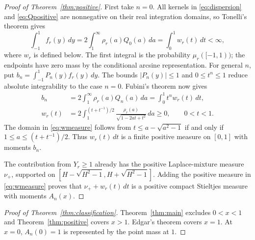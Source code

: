 \begin{proof}[Proof of Theorem~\ref{thm:positive}]
First take $n=0$. All kernels in \eqref{eq:dispersion} and
\eqref{eq:Qpositive} are nonnegative on their real integration domains,
so Tonelli's theorem gives
\[
 \int_{-1}^1 f_r(y)\,dy
 =2\int_1^\infty\rho_r(a)Q_0(a)\,da
 =\int_0^1 w_r(t)\,dt<\infty,
\]
where $w_r$ is defined below. The first integral is the probability
$\mu_r([-1,1))$; the endpoints have zero mass by the conditional
arcsine representation. For general $n$, put
$b_n=\int_{-1}^1P_n(y)f_r(y)\,dy$. The bounds $|P_n(y)|\le1$ and
$0\le t^n\le1$ reduce absolute integrability to the case $n=0$.
Fubini's theorem now gives
\begin{align}
 b_n&=2\int_1^\infty \rho_r(a)Q_n(a)\,da
      =\int_0^1 t^n w_r(t)\,dt,\label{eq:positiveremainder}\\
 w_r(t)&=2\int_1^{(t+t^{-1})/2}
       \frac{\rho_r(a)}{\sqrt{1-2at+t^2}}\,da\ge0,
            \qquad 0<t<1.\label{eq:wmeasure}
\end{align}
The domain in \eqref{eq:wmeasure} follows from
$t\le a-\sqrt{a^2-1}$ if and only if
$1\le a\le(t+t^{-1})/2$. Thus $w_r(t)\,dt$ is a finite positive
measure on $[0,1]$ with moments $b_n$.

The contribution from $Y_r\ge1$ already has the positive Laplace-mixture
measure $\nu_+$, supported on
$[H-\sqrt{H^2-1},H+\sqrt{H^2-1}]$.
Adding the positive measure in \eqref{eq:wmeasure} proves that
$\nu_++w_r(t)\,dt$ is a positive compact Stieltjes measure with moments
$A_n(x)$.
\end{proof}

\begin{proof}[Proof of Theorem~\ref{thm:classification}]
Theorem~\ref{thm:main} excludes $0<x<1$ and
Theorem~\ref{thm:positive} covers $x>1$. Edgar's theorem \cite{Edgar}
covers $x=1$. At $x=0$, $A_n(0)=1$ is represented by
the point mass at $1$.
\end{proof}
